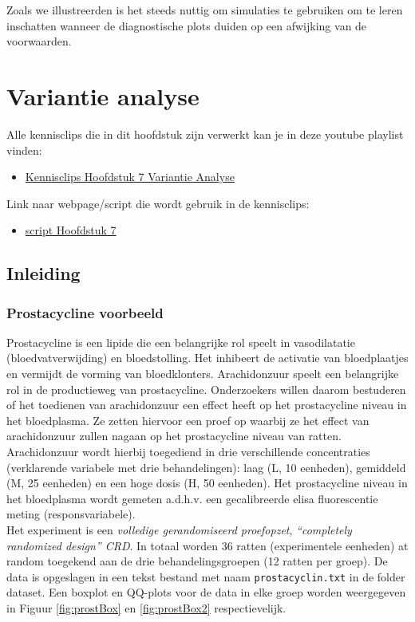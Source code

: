 \documentclass[
  12pt,dutch]{book}
\providecommand{\tightlist}{%
  \setlength{\itemsep}{0pt}\setlength{\parskip}{0pt}}
\theoremstyle{definition}
\theoremstyle{definition}
\theoremstyle{definition}
\theoremstyle{definition}
\theoremstyle{remark}
\begin{document}
Zoals we illustreerden is het steeds nuttig om simulaties te gebruiken om te leren inschatten wanneer de diagnostische plots duiden op een afwijking van de voorwaarden.

\chapter{Variantie analyse}\label{chap-anova}

Alle kennisclips die in dit hoofdstuk zijn verwerkt kan je in deze youtube playlist vinden:

\begin{itemize}
\tightlist
\item
  \href{https://www.youtube.com/playlist?list=PLZH1hP8_LbJIBVGNQ61zxMgc2srezPpnB}{Kennisclips Hoofdstuk 7 Variantie Analyse}
\end{itemize}

Link naar webpage/script die wordt gebruik in de kennisclips:

\begin{itemize}
\tightlist
\item
  \href{https://statomics.github.io/sbc/rmd/07-Anova.html}{script Hoofdstuk 7}
\end{itemize}

\section{Inleiding}\label{inleiding-6}

\subsection{Prostacycline voorbeeld}\label{prostacycline-voorbeeld}

Prostacycline is een lipide die een belangrijke rol speelt in vasodilatatie (bloedvatverwijding) en bloedstolling.
Het inhibeert de activatie van bloedplaatjes en vermijdt de vorming van bloedklonters.
Arachidonzuur speelt een belangrijke rol in de productieweg van prostacycline.
Onderzoekers willen daarom bestuderen of het toedienen van arachidonzuur een effect heeft op het prostacycline niveau in het bloedplasma.
Ze zetten hiervoor een proef op waarbij ze het effect van arachidonzuur zullen nagaan op het prostacycline niveau van ratten.
Arachidonzuur wordt hierbij toegediend in drie verschillende concentraties (verklarende variabele met drie behandelingen): laag (L, 10 eenheden), gemiddeld (M, 25 eenheden) en een hoge dosis (H, 50 eenheden).
Het prostacycline niveau in het bloedplasma wordt gemeten a.d.h.v. een gecalibreerde elisa fluorescentie meting (responsvariabele).\\
Het experiment is een \emph{volledige gerandomiseerd proefopzet}, \emph{``completely randomized design'' CRD}. In totaal worden 36 ratten (experimentele eenheden) at random toegekend aan de drie behandelingsgroepen (12 ratten per groep).
De data is opgeslagen in een tekst bestand met naam \texttt{prostacyclin.txt} in de folder dataset.
Een boxplot en QQ-plots voor de data in elke groep worden weergegeven in Figuur \ref{fig:prostBox} en \ref{fig:prostBox2} respectievelijk.
\end{document}
